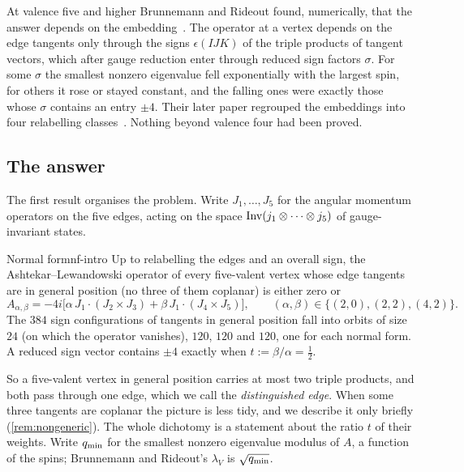At valence five and higher Brunnemann and Rideout found, numerically, that the
answer depends on the embedding~\cite{BR2008a,BR2008b,BR2010}. The operator at a
vertex depends on the edge tangents only through the signs $\epsilon(IJK)$ of the
triple products of tangent vectors, which after gauge reduction enter through
reduced sign factors $\sigma$. For some $\sigma$ the smallest nonzero eigenvalue
fell exponentially with the largest spin, for others it rose or stayed constant,
and the falling ones were exactly those whose $\sigma$ contains an entry $\pm4$.
Their later paper regrouped the embeddings into four relabelling
classes~\cite{BR2010}. Nothing beyond valence four had been proved.

\subsection{The answer}

The first result organises the problem. Write $J_1,\dots,J_5$ for the angular
momentum operators on the five edges, acting on the space $\operatorname{Inv}(j_1\otimes\cdots
\otimes j_5)$ of gauge-invariant states.

\begin{theorem}{Normal form}{nf-intro}
Up to relabelling the edges and an overall sign, the Ashtekar--Lewandowski operator
of every five-valent vertex whose edge tangents are in general position (no three of
them coplanar) is either zero or
\begin{equation}\label{eq:nf}
  A_{\alpha,\beta}=-4i\bigl[\alpha\,J_1\cdot(J_2\times J_3)+\beta\,J_1\cdot(J_4\times J_5)\bigr],
  \qquad(\alpha,\beta)\in\{(2,0),(2,2),(4,2)\}.
\end{equation}
The $384$ sign configurations of tangents in general position fall into orbits of
size $24$ (on which the operator vanishes), $120$, $120$ and $120$, one for each
normal form. A reduced sign vector
contains $\pm4$ exactly when $t:=\beta/\alpha=\frac12$.
\end{theorem}

So a five-valent vertex in general position carries at most two triple products, and
both pass through one edge, which we call the \emph{distinguished edge}. When some three
tangents are coplanar the picture is less tidy, and we describe it only briefly
(\cref{rem:nongeneric}). The whole dichotomy is a
statement about the ratio $t$ of their weights. Write $q_{\min}$ for the smallest
nonzero eigenvalue modulus of $A$, a function of the spins; Brunnemann and Rideout's
$\lambda_V$ is $\sqrt{q_{\min}}$.

